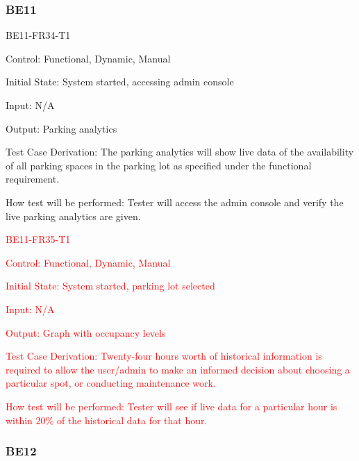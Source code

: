 \documentclass[12pt, titlepage]{article}
\begin{document}
\subsubsection{BE11}
\begin{enumerate}
    \item{BE11-FR34-T1}

    Control: Functional, Dynamic, Manual
    					
    Initial State: System started, accessing admin console
    					
    Input: N/A
    					
    Output: Parking analytics
    
    Test Case Derivation: The parking analytics will show live data of the
    availability of all parking spaces in the parking lot as specified under the
    functional requirement.
    					
    How test will be performed: Tester will access the admin console and verify
    the live parking analytics are given.

    \textcolor{red}{\item{BE11-FR35-T1}}
    
    \textcolor{red}{Control: Functional, Dynamic, Manual}
    
    \textcolor{red}{Initial State: System started, parking lot selected}
    					
    \textcolor{red}{Input: N/A}
    					
    \textcolor{red}{Output: Graph with occupancy levels}
    
    \textcolor{red}{Test Case Derivation: Twenty-four hours worth of historical information is required to allow the user/admin to make an informed decision about choosing a particular spot, or conducting maintenance work.}
    
    \textcolor{red}{How test will be performed: Tester will see if live data for a particular hour is within 20\% of the historical data for that hour.}
\end{enumerate}

\subsubsection{BE12}
\end{document}
